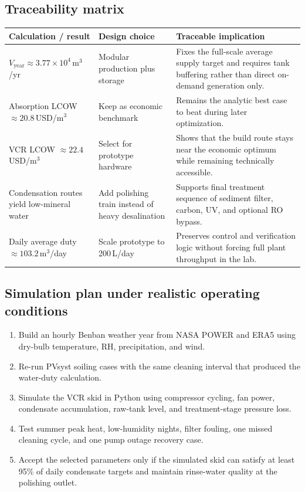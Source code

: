 \documentclass[11pt,a4paper]{article}
\begin{document}
\subsection{Traceability matrix}
\begin{table}[h]
\centering
\small
\begin{tabular}{@{}p{3.9cm}p{3.8cm}p{7.1cm}@{}}
\toprule
\textbf{Calculation / result} & \textbf{Design choice} & \textbf{Traceable implication} \\
\midrule
$V_{\mathrm{year}}\approx 3.77\times 10^4$\,m$^3$/yr & Modular production plus storage & Fixes the full-scale average supply target and requires tank buffering rather than direct on-demand generation only. \\
Absorption LCOW $\approx 20.8$\,USD/m$^3$ & Keep as economic benchmark & Remains the analytic best case to beat during later optimization. \\
VCR LCOW $\approx 22.4$\,USD/m$^3$ & Select for prototype hardware & Shows that the build route stays near the economic optimum while remaining technically accessible. \\
Condensation routes yield low-mineral water & Add polishing train instead of heavy desalination & Supports final treatment sequence of sediment filter, carbon, UV, and optional RO bypass. \\
Daily average duty $\approx 103.2$\,m$^3$/day & Scale prototype to 200\,L/day & Preserves control and verification logic without forcing full plant throughput in the lab. \\
\bottomrule
\end{tabular}
\end{table}

\subsection{Simulation plan under realistic operating conditions}
\begin{enumerate}[leftmargin=*]
  \item Build an hourly Benban weather year from NASA POWER and ERA5 using dry-bulb temperature, RH, precipitation, and wind.
  \item Re-run PVsyst soiling cases with the same cleaning interval that produced the water-duty calculation.
  \item Simulate the VCR skid in Python using compressor cycling, fan power, condensate accumulation, raw-tank level, and treatment-stage pressure loss.
  \item Test summer peak heat, low-humidity nights, filter fouling, one missed cleaning cycle, and one pump outage recovery case.
  \item Accept the selected parameters only if the simulated skid can satisfy at least 95\% of daily condensate targets and maintain rinse-water quality at the polishing outlet.
\end{enumerate}
\end{document}
